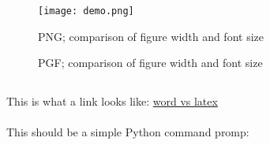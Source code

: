 \documentclass[a4paper,twoside,UTF8]{article}
\begin{document}
		\begin{figure}[ht]
			\texttt{[image: demo.png]}
			\caption{PNG; comparison of figure width and font size}
			\label{fig:png_label}
		\end{figure}

		\begin{figure}[ht]
			\caption{PGF; comparison of figure width and font size}
			\label{fig:pgf_label}
		\end{figure}

		\subsection{}
			\paragraph{}
				This is what a link looks like: \href{http://tex.stackexchange.com/questions/120154/is-latex-nowadays-still-that-superior-to-word}{word vs latex}
			\paragraph{}
				This should be a simple Python command promp:
			\paragraph{}
\end{document}
